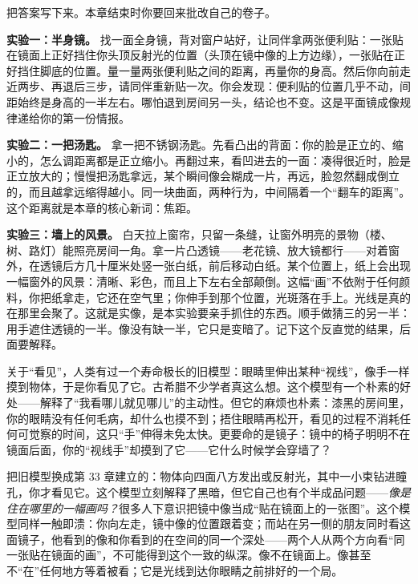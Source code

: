 \begin{mainline}
把答案写下来。本章结束时你要回来批改自己的卷子。


\begin{experiment}

\textbf{实验一：半身镜。} 找一面全身镜，背对窗户站好，让同伴拿两张便利贴：一张贴在镜面上正好挡住你头顶反射光的位置（头顶在镜中像的上方边缘），一张贴在正好挡住脚底的位置。量一量两张便利贴之间的距离，再量你的身高。然后你向前走近两步、再退后三步，请同伴重新贴一次。你会发现：便利贴的位置几乎不动，间距始终是身高的一半左右。哪怕退到房间另一头，结论也不变。这是平面镜成像规律递给你的第一份情报。

\textbf{实验二：一把汤匙。} 拿一把不锈钢汤匙。先看凸出的背面：你的脸是正立的、缩小的，怎么调距离都是正立缩小。再翻过来，看凹进去的一面：凑得很近时，脸是正立放大的；慢慢把汤匙拿远，某个瞬间像会糊成一片，再远，脸忽然翻成倒立的，而且越拿远缩得越小。同一块曲面，两种行为，中间隔着一个“翻车的距离”。这个距离就是本章的核心新词：焦距。

\textbf{实验三：墙上的风景。} 白天拉上窗帘，只留一条缝，让窗外明亮的景物（楼、树、路灯）能照亮房间一角。拿一片凸透镜——老花镜、放大镜都行——对着窗外，在透镜后方几十厘米处竖一张白纸，前后移动白纸。某个位置上，纸上会出现一幅窗外的风景：清晰、彩色，而且上下左右全部颠倒。这幅“画”不依附于任何颜料，你把纸拿走，它还在空气里；你伸手到那个位置，光斑落在手上。光线是真的在那里会聚了。这就是实像，是本实验要亲手抓住的东西。顺手做猜三的另一半：用手遮住透镜的一半。像没有缺一半，它只是变暗了。记下这个反直觉的结果，后面要解释。

\end{experiment}


关于“看见”，人类有过一个寿命极长的旧模型：眼睛里伸出某种“视线”，像手一样摸到物体，于是你看见了它。古希腊不少学者真这么想。这个模型有一个朴素的好处——解释了“我看哪儿就见哪儿”的主动性。但它的麻烦也朴素：漆黑的房间里，你的眼睛没有任何毛病，却什么也摸不到；捂住眼睛再松开，看见的过程不消耗任何可觉察的时间，这只“手”伸得未免太快。更要命的是镜子：镜中的椅子明明不在镜面后面，你的“视线手”却摸到了它——它什么时候学会穿墙了？

把旧模型换成第 33 章建立的：物体向四面八方发出或反射光，其中一小束钻进瞳孔，你才看见它。这个模型立刻解释了黑暗，但它自己也有个半成品问题——\emph{像是住在哪里的一幅画吗？}很多人下意识把镜中像当成“贴在镜面上的一张图”。这个模型同样一触即溃：你向左走，镜中像的位置跟着变；而站在另一侧的朋友同时看这面镜子，他看到的像和你看到的在空间的同一个深处——两个人从两个方向看“同一张贴在镜面的画”，不可能得到这个一致的纵深。像不在镜面上。像甚至不“在”任何地方等着被看；它是光线到达你眼睛之前排好的一个局。


\end{mainline}
